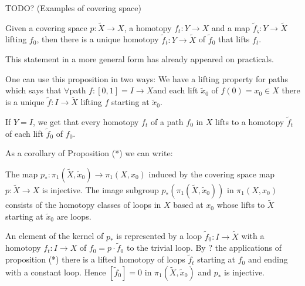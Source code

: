 \documentclass[12pt]{article}					%
\begin{document}

TODO? (Examples of covering space)

\begin{tvrzeni}
	Given a covering space $p: \tilde X \rightarrow X$, a homotopy $f_t: Y \rightarrow X$ and a map $\tilde f_ς: Y \rightarrow \tilde X$ lifting $f_0$, then there is a unique homotopy $\tilde f_t: Y \rightarrow \tilde X$ of $\tilde f_0$ that lifts $f_t$.

	\begin{poznamka}
		This statement in a more general form has already appeared on practicals.
	\end{poznamka}

	\begin{poznamka}
		One can use this proposition in two ways: We have a lifting property for paths which says that $\forall$path $f: [0, 1] = I \rightarrow X$and each lift $\tilde x_0$ of $f(0) = x_0 \in X$ there is a unique $\tilde f: I \rightarrow \tilde X$ lifting $f$ starting at $\tilde x_0$.

		If $Y = I$, we get that every homotopy $f_t$ of a path $f_0$ in $X$ lifts to a homotopy $\tilde f_t$ of each lift $\tilde f_0$ of $f_0$.

		As a corollary of Proposition (*) we can write:
	\end{poznamka}
\end{tvrzeni}

\begin{dusledek}
	The map $p_*: π_1(\tilde X, \tilde x_0) \rightarrow π_1(X, x_0)$ induced by the covering space map $p: \tilde X \rightarrow X$ is injective. The image subgroup $p_*(π_1(\tilde X, \tilde x_0))$ in $π_1(X, x_0)$ consists of the homotopy classes of loops in $X$ based at $x_0$ whose lifts to $\tilde X$ starting at $\tilde x_0$ are loops.
	
	\begin{dukazin}[Of corollary]
		An element of the kernel of $p_*$ is represented by a loop $\tilde f_0: I \rightarrow \tilde X$ with a homotopy $f_t: I \rightarrow X$ of $f_0 = p·\tilde f_0$ to the trivial loop. By ? the applications of proposition (*) there is a lifted homotopy of loops $\tilde f_t$ starting at $f_0$ and ending with a constant loop. Hence $[\tilde f_0] = 0$ in $π_1(\tilde X, \tilde x_0)$ and $p_*$ is injective.
	\end{dukazin}
\end{dusledek}
\end{document}
